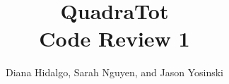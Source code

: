 \documentclass[11pt,letterpaper]{article}
\title{QuadraTot \\
{\normalsize \sc Code Review 1}}
\author{Diana Hidalgo, Sarah Nguyen,  and Jason Yosinski \\
\code{\{djh283,smn64,jy495\}@cornell.edu}}
\begin{document}
\maketitle
\normalem

\begin{abstract}

\end{abstract}




\end{document}
